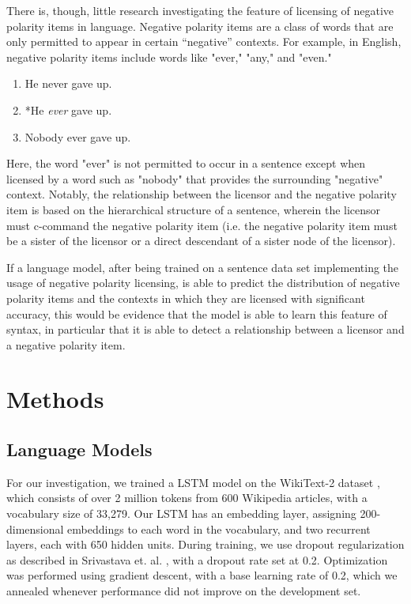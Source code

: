 \documentclass[11pt, round]{article}
\begin{document}
There is, though, little research investigating the feature of licensing of negative polarity items in language. Negative polarity items are a class of words that are only permitted to appear in certain “negative” contexts. For example, in English, negative polarity items include words like "ever," "any," and "even."
\begin{enumerate}
    \item He never gave up.
    \item *He \textit{ever} gave up.
    \item Nobody ever gave up.
\end{enumerate}
Here, the word "ever" is not permitted to occur in a sentence except when licensed by a word such as "nobody" that provides the surrounding "negative" context. Notably, the relationship between the licensor and the negative polarity item is based on the hierarchical structure of a sentence, wherein the licensor must c-command the negative polarity item (i.e. the negative polarity item must be a sister of the licensor or a direct descendant of a sister node of the licensor).

If a language model, after being trained on a sentence data set implementing the usage of negative polarity licensing, is able to predict the distribution of negative polarity items and the contexts in which they are licensed with significant accuracy, this would be evidence that the model is able to learn this feature of syntax, in particular that it is able to detect a relationship between a licensor and a negative polarity item.

\section{Methods}
\subsection{Language Models}

For our investigation, we trained a LSTM model on the WikiText-2 dataset \cite{merity2016pointer}, which consists of over 2 million tokens from 600 Wikipedia articles, with a vocabulary size of 33,279. Our LSTM has an embedding layer, assigning 200-dimensional embeddings to each word in the vocabulary, and two recurrent layers, each with 650 hidden units. During training, we use dropout regularization as described in Srivastava et. al. , with a dropout rate set at 0.2. Optimization was performed using gradient descent, with a base learning rate of 0.2, which we annealed whenever performance did not improve on the development set.
\end{document}
